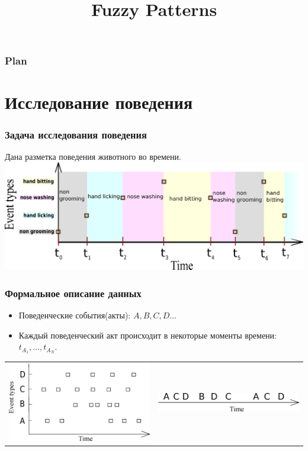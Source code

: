 \documentclass[smaller]{beamer}
\title{Fuzzy Patterns} %
\institute[Moscow State University] %
{
  \inst{1}
  Moscow State University
}
\date[Patterns] %
{}
\begin{document}
\begin{frame}
  \titlepage
\end{frame}

\begin{frame}
  \frametitle{Plan}
  \tableofcontents
\end{frame}



\section{Исследование поведения}


\begin{frame}	
  \frametitle{Задача исследования поведения}
Дана разметка поведения животного во времени.
\includegraphics[scale=0.40]{beh_data.eps}
\end{frame}


\begin{frame}	
  \frametitle{Формальное описание данных}
\begin{itemize}
  \item Поведенческие события(акты): $A,B,C,D\dots$
  \item Каждый поведенческий акт происходит в некоторые моменты времени: $t_{A_1},\dots,t_{A_N}$. 
\end{itemize}
\begin{left}
\begin{tabular}[t]{p{12em}|p{12em}}
    \includegraphics[scale=0.25]{NEWTS.eps} & \includegraphics[scale=0.25]{TSNEW2.eps}\\
\end{tabular}
\end{left}
\end{frame}
\end{document}
